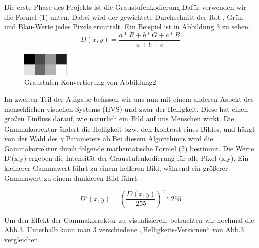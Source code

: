 \documentclass[course=erap]{aspdoc}
\begin{document}
\par
Die erste Phase des Projekts ist die Graustufenkodierung\cite{wikipedia2024grayscale}.Dafür verwenden wir die Formel (1) unten. Dabei wird der gewichtete Durchschnitt der Rot-, Grün- und Blau-Werte jedes Pixels ermittelt. Ein Beispiel ist in Abbildung 3 zu sehen. 
\begin{equation}
D(x,y)=\frac{a*R+b*G+c*B}{a+b+c}
\end{equation}


\begin{figure}[h]
\centering
\includegraphics[width=0.2\textwidth]{Bilder/gamma1.pgm.png}
\caption{Graustufen Konvertierung von Abbildung2}
\end{figure}

\par
Im zweiten Teil der Aufgabe befassen wir uns nun mit einem anderen Aspekt des menschlichen visuellen Systems (HVS) und zwar der Helligkeit\cite{wikipedia2023gammakorrektur}. Diese hat einen großen Einfluss darauf, wie natürlich ein Bild auf uns Menschen wirkt. Die Gammakorrektur ändert die Helligkeit bzw. den Kontrast eines Bildes, und hängt von der Wahl des $ \gamma $ Parameters ab.Bei diesem Algorithmus wird die Gammakorrektur durch folgende mathematische Formel (2) bestimmt. Die Werte D'(x,y) ergeben die Intensität der Graustufenkodierung für alle Pixel (x,y). Ein kleinerer Gammawert führt zu einem helleren Bild, während ein größerer Gammawert zu einem dunkleren Bild führt.

\begin{equation}
D'(x,y)={\left( \frac{D(x,y)}{255} \right)}^{\gamma}*255
\end{equation}

\par
Um den Effekt der Gammakorrektur zu visualisieren, betrachten wir nochmal die Abb.3. Unterhalb kann man 3 verschiedene „Helligkeits-Versionen“ von Abb.3 vergleichen.
\end{document}
